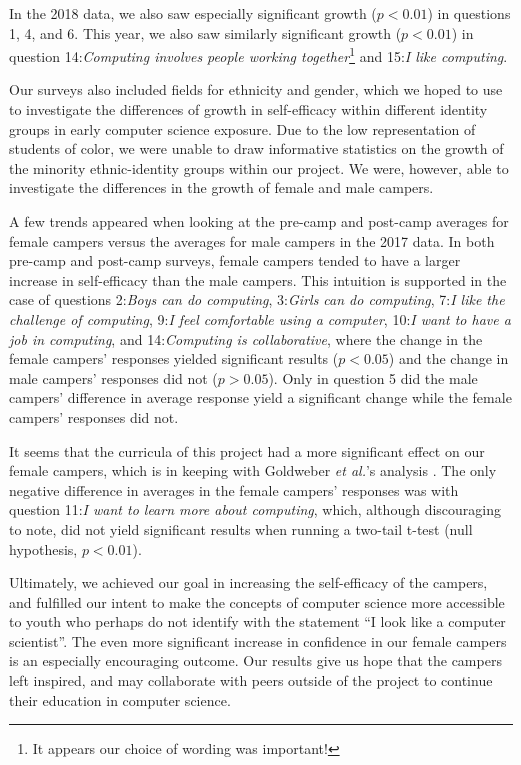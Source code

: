 In the 2018 data, we also saw especially significant growth ($p <
0.01$) in questions 1, 4, and 6.  This year, we also saw similarly
significant growth ($p < 0.01$) in question 14:\textit{Computing
involves people working together}\footnote{It appears our choice
of wording was important!} and 15:\textit{I like computing}.

Our surveys also included fields for ethnicity and gender, which
we hoped to use to investigate the differences of growth in
self-efficacy within different identity groups in early computer
science exposure. Due to the low representation of students of
color, we were unable to draw informative statistics on the growth
of the minority ethnic-identity groups within our project. We were,
however, able to investigate the differences in the growth of female
and male campers.

A few trends appeared when looking at the pre-camp and post-camp
averages for female campers versus the averages for male campers
in the 2017 data.  In both pre-camp and post-camp surveys, female
campers tended to have a larger increase in self-efficacy than the
male campers. This intuition is supported in the case of questions
2:\textit{Boys can do computing}, 3:\textit{Girls can do computing},
7:\textit{I like the challenge of computing}, 9:\textit{I feel
comfortable using a computer}, 10:\textit{I want to have a job in
computing}, and 14:\textit{Computing is collaborative}, where the
change in the female campers' responses yielded significant results
($p < 0.05$) and the change in male campers' responses did not ($p
> 0.05$). Only in question 5 did the male campers' difference in
average response yield a significant change while the female campers'
responses did not.

It seems that the curricula of this project had a more significant
effect on our female campers, which is in keeping with Goldweber
\textit{et al.}'s analysis \cite{Goldweber2013}.  The only negative
difference in averages in the female campers' responses was with
question 11:\textit{I want to learn more about computing}, which,
although discouraging to note, did not yield significant results
when running a two-tail t-test (null hypothesis, $p < 0.01$).

Ultimately, we achieved our goal in increasing the self-efficacy
of the campers, and fulfilled our intent to make the concepts of
computer science more accessible to youth who perhaps do not identify
with the statement ``I look like a computer scientist''. The even
more significant increase in confidence in our female campers is
an especially encouraging outcome. Our results give us hope that
the campers left inspired, and may collaborate with peers outside
of the project to continue their education in computer science.

